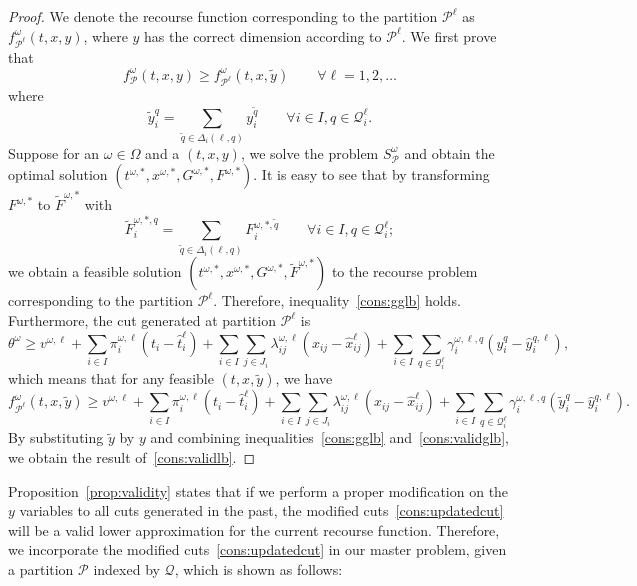 \documentclass[11pt]{article}
\newcommand{\noi}{\noindent}
\begin{document}
	\begin{proof}
		We denote the recourse function corresponding to the partition \(\mathcal{P}^{\ell}\) as \(f^\omega_{\mathcal{P}^\ell}(t,x,y)\), where \(y\) has the correct dimension according to \(\mathcal{P}^\ell\). We first prove that 
		\begin{equation} \label{cons:gglb}
		f^\omega_{\mathcal{P}}(t,x,y) \geq f^{\omega}_{\mathcal{P}^\ell}(t,x,\tilde{y}) \qquad \forall \ell = 1,2,\dots
		\end{equation}
		where \[\tilde{y}_i^{q} =  \sum_{\tilde{q} \in \Delta_i(\ell,q)} y_i^{\tilde{q}} \qquad  \forall i \in I, q \in \mathcal{Q}^\ell_i. \]
		Suppose for an \(\omega \in \Omega\) and a \((t,x,y)\), we solve the problem \(S_{\mathcal{P}}^\omega\) and obtain the optimal solution \((t^{\omega,*},x^{\omega,*},G^{\omega,*},F^{\omega,*})\). It is easy to see that by transforming \(F^{\omega,*}\) to \(\tilde{F}^{\omega,*}\) with \[\tilde{F}^{\omega,*,q}_i = \sum_{\tilde{q} \in \Delta_i(\ell,q) }F_i^{\omega,*,\tilde{q}} \qquad  \forall i \in I, q \in \mathcal{Q}^\ell_i;\]
		we obtain a feasible solution \((t^{\omega,*},x^{\omega,*},G^{\omega,*},\tilde{F}^{\omega,*})\) to the recourse problem corresponding to the partition \(\mathcal{P}^\ell\). Therefore, inequality~\eqref{cons:gglb} holds. Furthermore, the cut generated at partition \(\mathcal{P}^\ell\) is
		\[\theta^\omega \geq v^{\omega,\ell} + \sum_{i \in I} \pi_i^{\omega,\ell} (t_i - \hat{t}_i^{\ell}) + \sum_{i \in I} \sum_{j \in J_i} \lambda_{ij}^{\omega,\ell} (x_{ij} - \hat{x}_{ij}^{\ell}) + \sum_{i \in I} \sum_{q \in \mathcal{Q}^{\ell}_i} \gamma_{i}^{\omega,\ell,q} \left( y_i^{q} - \hat{y}_i^{q,\ell} \right),\]
		which means that for any feasible \((t,x,\tilde{y})\), we have 
		\begin{equation} \label{cons:validglb}
		f^\omega_{\mathcal{P}^\ell}(t,x,\tilde{y}) \geq v^{\omega,\ell} + \sum_{i \in I} \pi_i^{\omega,\ell} (t_i - \hat{t}_i^{\ell}) + \sum_{i \in I} \sum_{j \in J_i} \lambda_{ij}^{\omega,\ell} (x_{ij} - \hat{x}_{ij}^{\ell}) + \sum_{i \in I} \sum_{q \in \mathcal{Q}^{\ell}_i} \gamma_{i}^{\omega,\ell,q} \left( \tilde{y}_i^{q} - \hat{y}_i^{q,\ell} \right).
		\end{equation}
		By substituting \(\tilde{y}\) by \(y\) and combining inequalities~\eqref{cons:gglb} and~\eqref{cons:validglb}, we obtain the result of~\eqref{cons:validlb}.
	\end{proof}
	\noi Proposition~\ref{prop:validity} states that if we perform a proper modification on the \(y\) variables to all cuts generated in the past, the modified cuts~\eqref{cons:updatedcut} will be a valid lower approximation for the current recourse function. Therefore, we incorporate the modified cuts~\eqref{cons:updatedcut} in our master problem, given a partition \(\mathcal{P}\) indexed by \(\mathcal{Q}\), which is shown as follows:
\end{document}

